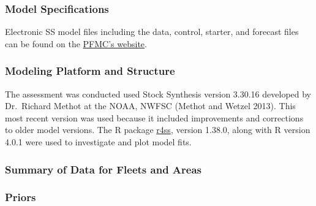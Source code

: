 \documentclass[11pt,
  english,
  a4paper,
]{article}
\begin{document}
\hypertarget{model-specifications}{%
\subsubsection{Model Specifications}\label{model-specifications}}

\leavevmode\tagmcend\tagstructend

Electronic SS model files including the data, control, starter, and forecast files can be found on the {\href{https://www.pcouncil.org/groundfish/stock-assessments/}{PFMC's website}\leavevmode\tagmcend\tagstructend}.


\hypertarget{modeling-platform-and-structure}{%
\subsubsection{Modeling Platform and Structure}\label{modeling-platform-and-structure}}

\leavevmode\tagmcend\tagstructend

The assessment was conducted used Stock Synthesis version 3.30.16 developed by Dr.~Richard Methot at the NOAA, NWFSC {(Methot and Wetzel 2013)\leavevmode\tagmcend\tagstructend}. This most recent version was used because it included improvements and corrections to older model versions. The R package {\href{https://github.com/r4ss/r4ss}{r4ss}\leavevmode\tagmcend\tagstructend}, version 1.38.0, along with R version 4.0.1 were used to investigate and plot model fits.


\hypertarget{summary-of-data-for-fleets-and-areas}{%
\subsubsection{Summary of Data for Fleets and Areas}\label{summary-of-data-for-fleets-and-areas}}

\leavevmode\tagmcend\tagstructend


\hypertarget{priors}{%
\subsubsection{Priors}\label{priors}}
\end{document}
